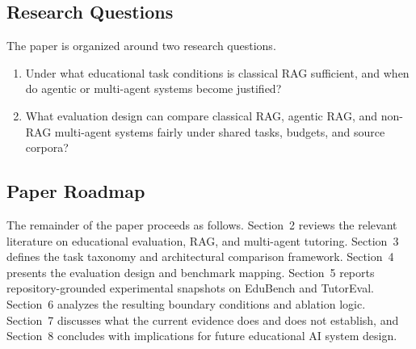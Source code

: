 \subsection{Research Questions}

The paper is organized around two research questions.

\begin{enumerate}[label=RQ\arabic*:,leftmargin=*]
    \item Under what educational task conditions is classical RAG sufficient, and when do agentic or multi-agent systems become justified?
    \item What evaluation design can compare classical RAG, agentic RAG, and non-RAG multi-agent systems fairly under shared tasks, budgets, and source corpora?
\end{enumerate}

\subsection{Paper Roadmap}

The remainder of the paper proceeds as follows. Section~2 reviews the relevant literature on educational evaluation, RAG, and multi-agent tutoring. Section~3 defines the task taxonomy and architectural comparison framework. Section~4 presents the evaluation design and benchmark mapping. Section~5 reports repository-grounded experimental snapshots on EduBench and TutorEval. Section~6 analyzes the resulting boundary conditions and ablation logic. Section~7 discusses what the current evidence does and does not establish, and Section~8 concludes with implications for future educational AI system design.

